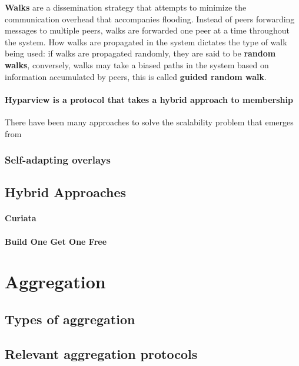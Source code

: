 \textbf{Walks} are a dissemination strategy that attempts to minimize the communication overhead that accompanies flooding. Instead of peers forwarding messages to multiple peers, walks are forwarded one peer at a time throughout the system. How walks are propagated in the system dictates the type of walk being used: if walks are propagated randomly, they are said to be \textbf{random walks}, conversely, walks may take a biased paths in the system based on information accumulated by peers, this is called \textbf{guided random walk}.

\paragraph{\textbf{Hyparview} \cite{Hyparview} is a protocol that takes a hybrid approach to membership}

There have been many approaches to solve the scalability problem that emerges from

\subsubsection{Self-adapting overlays}

\subsection{Hybrid Approaches}

\paragraph{\textbf{Curiata}}

\paragraph{\textbf{Build One Get One Free}}


\section{Aggregation} 
\label{sec:aggregation}

\subsection{Types of aggregation}

\subsection{Relevant aggregation protocols}

